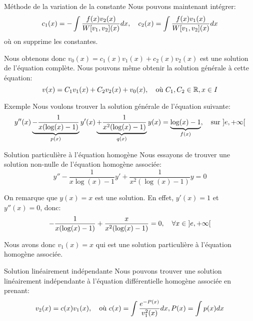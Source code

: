 \documentclass[a4paper]{article}
\begin{document}
\begin{parag}{Méthode de la variation de la constante}
    Nous pouvons maintenant intégrer:
    \[c_1\left(x\right) = -\int \frac{f\left(x\right) v_2\left(x\right)}{W\left[v_1, v_2\right]\left(x\right)}dx, \mathspace c_2\left(x\right) = \int \frac{f\left(x\right) v_1\left(x\right)}{W\left[v_1, v_2\right]\left(x\right)}dx\]
    où on supprime les constantes.

     Nous obtenons donc $v_0\left(x\right) = c_1\left(x\right) v_1\left(x\right) + c_2\left(x\right) v_2\left(x\right)$ est une solution de l'équation complète. Nous pouvons même obtenir la solution générale à cette équation:
     \[v\left(x\right) = C_1 v_1\left(x\right) + C_2 v_2\left(x\right) + v_0\left(x\right), \mathspace \text{où } C_1, C_2 \in \mathbb{R}, x \in I\]
\end{parag}

\begin{parag}{Exemple}
    Nous voulons trouver la solution générale de l'équation suivante:
    \[y''\left(x\right) \underbrace{- \frac{1}{x \left(\log\left(x\right) - 1\right)}}_{p\left(x\right)} y'\left(x\right) \underbrace{+ \frac{1}{x^2 \left(\log\left(x\right) - 1\right)}}_{q\left(x\right)} y\left(x\right) = \underbrace{\log\left(x\right) - 1}_{f\left(x\right)}, \mathspace \text{sur } \left]e, +\infty\right[ \]

    \begin{subparag}{Solution particulière à l'équation homogène}
        Nous essayons de trouver une solution non-nulle de l'équation homogène associée:
        \[y'' - \frac{1}{x \log\left(x\right) - 1} y' + \frac{1}{x^2 \left(\log\left(x\right) - 1\right)} y = 0\]

        On remarque que $y\left(x\right) = x$ est une solution. En effet, $y'\left(x\right) = 1$ et $y''\left(x\right) = 0$, donc:
        \[-\frac{1}{x \left(\log\left(x\right) - 1\right)} + \frac{x}{x^2 \left(\log\left(x\right) - 1\right)} = 0,\mathspace \forall x \in \left]e, +\infty\right[ \]

        Nous avons donc $v_1\left(x\right) = x$ qui est une solution particulière à l'équation homogène associée.
    \end{subparag}

    \begin{subparag}{Solution linéairement indépendante}
        Nous pouvons trouver une solution linéairement indépendante
 à l'équation différentielle homogène associée en prenant:
     \[v_2\left(x\right) = c\left(x\right) v_1\left(x\right), \mathspace \text{où } c\left(x\right) = \int \frac{e^{-P\left(x\right)}}{v_1^2\left(x\right)}dx, P\left(x\right) = \int p\left(x\right) dx\]


\end{subparag}
\end{parag}
\end{document}
